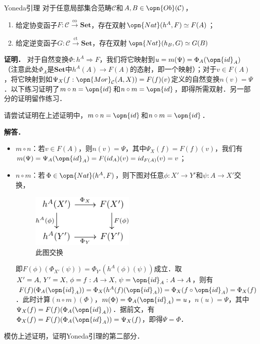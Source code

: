 \begin{theorem}{Yoneda引理}
对于任意局部集合范畴$\mathcal{C}$和$A,B\in\opn{Ob}(\mathcal{C})$，
\begin{enumerate}
\item 给定协变函子$F:\mathcal{C}\overset{\text{co}}{\to}\mathbf{Set}$，存在双射$\opn{Nat}(h^A,F)\simeq F(A)$；
\item 给定逆变函子$G:\mathcal{C}\overset{\text{ct}}{\to}\mathbf{Set}$，存在双射$\opn{Nat}(h_B,G)\simeq G(B)$
\end{enumerate}
\end{theorem}
\textbf{证明．}
对于自然变换$\Phi:h^A\Rightarrow F$，我们将它映射到$u=m(\Psi)=\Phi_A(\opn{id}_A)$（注意此处$\Phi_A$是$\mathbf{Set}$中$h^A(A)\to F(A)$的态射，即一个映射）；对于$v\in F(A)$，将它映射到如$\Psi_X(f:\opn{Mor}_\mathcal{C}(A,X))=F(f)(v)$定义的自然变换$n(v)=\Psi$．以下练习证明了$m\circ n=\opn{id}$和$n\circ m=\opn{id}$，即得所需双射．另一部分的证明留作练习．
\begin{exercise}{}
请尝试证明在上述证明中，$m\circ n=\opn{id}$和$n\circ m=\opn{id}$．
\end{exercise}
\textbf{解答．}
\begin{itemize}
\item $m\circ n$：若$v\in F(A)$，则$n(v)=\Psi$，其中$\Psi_X(f)=F(f)(v)$，我们有$m(\Psi)=\Psi_A(\opn{id}_A)=F(id_A)(v)=id_{F(A)}(v)=v$；
\item $n\circ m$：若$\Phi\in\opn{Nat}(h^A,F)$，则下图对任意$\phi:X'\to Y'$和$\psi:A\to X'$交换，
\begin{figure}[ht]
\centering
\includegraphics[width=5cm]{./figures/Cat3.pdf}
\caption{此图交换} \label{Cat_fig3}
\end{figure}
即$F(\phi)(\Phi_{X'}(\psi))=\Phi_{Y'}(h^A(\phi)(\psi))$成立．取$X'=A,\,Y'=X,\,\phi=f:A\to X,\,\psi=\opn{id}_A:A\to A$，则有$F(f)(\Phi_A(\opn{id}_A))=\Phi_X(h^A(f)(\opn{id}_A))=\Phi_X(f\circ\opn{id}_A)=\Phi_X(f)$．此时计算$(n\circ m)(\Phi)$，$m(\Phi)=\Phi_A(\opn{id}_A)=u$，$n(u)=\Psi$，其中$\Psi_X(f)=F(f)(\Phi_A(\opn{id}_A))$．据前文，有$\Phi_X(f)=F(f)(\Phi_A(\opn{id}_A))=\Psi_X(f)$，即得$\Psi=\Phi$．
\end{itemize}
\begin{exercise}{}
模仿上述证明，证明Yoneda引理的第二部分．
\end{exercise}